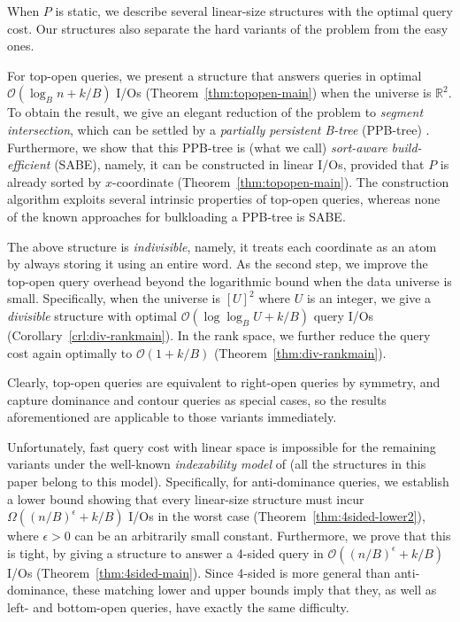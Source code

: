 \documentclass{sig-alternate}
\def\eps{\epsilon}
\def\real{\mathbb{R}}
\def\extraspacing{\vspace{2mm} \noindent}
\def\eps{\epsilon}
\newcommand{\bigO}{\mathcal{O}}
\renewcommand{\(}{\left(}
\renewcommand{\)}{\right)}
\begin{document}
\extraspacing {\bf Static Range Skyline.} When $P$ is static, we describe several linear-size structures with the optimal query cost. Our structures also separate the hard variants of the problem from the easy ones.

For top-open queries, we present a structure that answers queries in optimal $\bigO(\log_B n + k/B)$ I/Os (Theorem~\ref{thm:topopen-main}) when the universe is $\real^2$. To obtain the result, we give an elegant reduction of the problem to {\em segment intersection}, which can be settled by a {\em partially persistent B-tree} (PPB-tree) \cite{BGOSW96}. Furthermore, we show that this PPB-tree is (what we call) {\em sort-aware build-efficient} (SABE), namely, it can be constructed in linear I/Os, provided that $P$ is already sorted by $x$-coordinate (Theorem~\ref{thm:topopen-main}). The construction algorithm exploits several intrinsic properties of top-open queries, whereas none of the known approaches \cite{A03, BSW97, V08} for bulkloading a PPB-tree is SABE.

The above structure is {\em indivisible}, namely, it treats each coordinate as an atom by always storing it using an entire word. As the second step, we improve the top-open query overhead beyond the logarithmic bound when the data universe is small. Specifically, when the universe is $[U]^2$ where $U$ is an integer, we give a {\em divisible}  structure with optimal $\bigO(\log \log_B U + k/B)$ query I/Os (Corollary~\ref{crl:div-rankmain}). In the rank space, we further reduce the query cost again optimally to $\bigO(1 + k/B)$ (Theorem~\ref{thm:div-rankmain}).

Clearly, top-open queries are equivalent to right-open queries by symmetry, and capture dominance and contour queries as special cases, so the results aforementioned are applicable to those variants immediately.

Unfortunately, fast query cost with linear space is impossible for the remaining variants under the well-known {\em indexability model} of \cite{HKMPS02} (all the structures in this paper belong to this model). Specifically, for anti-dominance queries, we establish a lower bound showing that every linear-size structure must incur $\Omega((n/B)^\epsilon + k/B)$ I/Os in the worst case (Theorem~\ref{thm:4sided-lower2}), where $\eps > 0$ can be an arbitrarily small constant. Furthermore, we prove that this is tight, by giving a structure to answer a 4-sided query in $\bigO((n/B)^\epsilon + k/B)$ I/Os (Theorem~\ref{thm:4sided-main}). Since 4-sided is more general than anti-dominance, these matching lower and upper bounds imply that they, as well as left- and bottom-open queries, have exactly the same difficulty.
\end{document}
